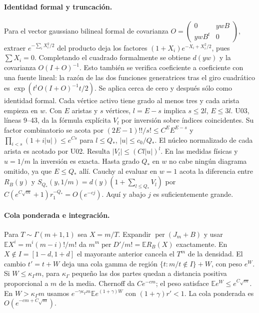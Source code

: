\paragraph{Identidad formal y truncación.}
Para el vector gaussiano bilineal formal de covarianza
$O=\left(\begin{smallmatrix}0&ywB\\ywB^t&0\end{smallmatrix}\right)$,
extraer $e^{-\sum_i X_i^2/2}$ del producto deja los factores
$(1+X_i)e^{-X_i+X_i^2/2}$, pues $\sum X_i=0$.
Completando el cuadrado formalmente se obtiene $d(yw)$ y la covarianza $O(I+O)^{-1}$.
Esto también se verifica coeficiente a coeficiente con una fuente lineal: la razón de las
dos funciones generatrices tras el giro cuadrático es
$\exp(t^tO(I+O)^{-1}t/2)$. Se aplica cerca de cero y después sólo como identidad formal.
Cada vértice activo tiene grado al menos tres y cada arista empieza en $w$.
Con $E$ aristas y $s$ vértices, $l=E-s$ implica $s\le2l$, $E\le3l$.
U03, líneas 9--43, da la fórmula explícita $V_l$ por inversión sobre índices coincidentes.
Su factor combinatorio se acota por $(2E-1)!!/s!\le C^E E^{E-s}$ y
$\prod_{i<s}(1+i|u|)\le e^{Cs}$ para $l\le Q_*$, $|u|\le c_0/Q_*$.
El núcleo normalizado de cada arista es acotado por U02. Resulta
$|V_l|\le(Cl|u|)^l$. En las medidas físicas y $u=1/m$ la inversión es exacta.
Hasta grado $Q_*$ en $w$ no cabe ningún diagrama omitido, ya que $E\le Q_*$ allí.
Cauchy al evaluar en $w=1$ acota la diferencia entre $R_B(y)$ y
$S_{Q_*}(y,1/m)=d(y)(1+\sum_{l\le Q_*}V_l)$ por
$C(e^{C\sqrt m}+1)r_1^{-Q_*}=O(e^{-cj})$. Aquí y abajo $j$ es suficientemente grande.

\paragraph{Cola ponderada e integración.}
Para $T\sim\Gamma(m+1,1)$ sea $X=m/T$. Expandir $\operatorname{per}(J_m+B)$
y usar $\mathbb E X^i=m^i(m-i)!/m!$ da
$m^m\operatorname{per}D'/m!=\mathbb E R_B(X)$ exactamente.
En $X\notin I=[1-d,1+d]$ el mayorante anterior cancela el $T^m$ de la densidad.
El cambio $t'=t+W$ deja una cola gamma de región
$\{t:m/t\notin I\}+W$, con peso $e^W$.
Si $W\le\kappa_\Gamma m$, para $\kappa_\Gamma$ pequeño las dos partes quedan a distancia
positiva proporcional a $m$ de la media. Chernoff da $Ce^{-cm}$; el peso satisface
$\mathbb E e^W\le e^{C\sqrt m}$.
En $W>\kappa_\Gamma m$ usamos $e^{-\gamma\kappa_\Gamma m}\mathbb E e^{(1+\gamma)W}$
con $(1+\gamma)r'<1$. La cola ponderada es $O(e^{-cm+C\sqrt m})$.

